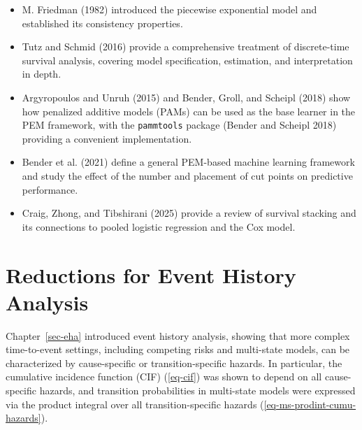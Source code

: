 \documentclass[
  letterpaper,
  krantz2]{style/krantz}
\providecommand{\tightlist}{%
  \setlength{\itemsep}{0pt}\setlength{\parskip}{0pt}}
\begin{document}
\begin{tcolorbox}[enhanced jigsaw, toprule=.15mm, bottomtitle=1mm, opacityback=0, breakable, leftrule=.75mm, title={Further reading}, toptitle=1mm, bottomrule=.15mm, colback=white, colframe=quarto-callout-tip-color-frame, titlerule=0mm, opacitybacktitle=0.6, coltitle=black, rightrule=.15mm, left=2mm, colbacktitle=quarto-callout-tip-color!10!white, arc=.35mm]

\begin{itemize}
\tightlist
\item
  M. Friedman (1982) introduced the piecewise exponential model and
  established its consistency properties.
\item
  Tutz and Schmid (2016) provide a comprehensive treatment of
  discrete-time survival analysis, covering model specification,
  estimation, and interpretation in depth.
\item
  Argyropoulos and Unruh (2015) and Bender, Groll, and Scheipl (2018)
  show how penalized additive models (PAMs) can be used as the base
  learner in the PEM framework, with the \texttt{pammtools} package
  (Bender and Scheipl 2018) providing a convenient implementation.
\item
  Bender et al. (2021) define a general PEM-based machine learning
  framework and study the effect of the number and placement of cut
  points on predictive performance.
\item
  Craig, Zhong, and Tibshirani (2025) provide a review of survival
  stacking and its connections to pooled logistic regression and the Cox
  model.
\end{itemize}

\end{tcolorbox}

\chapter{Reductions for Event History
Analysis}\label{sec-reductions-eha}

Chapter~\ref{sec-eha} introduced event history analysis, showing that
more complex time-to-event settings, including competing risks and
multi-state models, can be characterized by cause-specific or
transition-specific hazards. In particular, the cumulative incidence
function (CIF) (\ref{eq-cif}) was shown to depend on all cause-specific
hazards, and transition probabilities in multi-state models were
expressed via the product integral over all transition-specific hazards
(\ref{eq-ms-prodint-cumu-hazards}).
\end{document}
